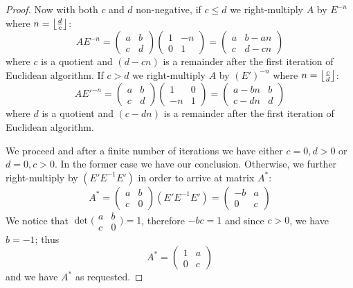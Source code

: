 \documentclass{article}
\theoremstyle{definition}
\DeclarePairedDelimiter\floor{\lfloor}{\rfloor}
\begin{document}
\begin{proof}
Now with both $c$ and $d$ non-negative, if $c \leq d$ we right-multiply $A$ by $E^{-n}$ where $n = \floor*{ \frac{d}{c} }$:
\[
    A E^{-n} =   
    \begin{pmatrix}
        a & b \\
        c & d
    \end{pmatrix}
    \begin{pmatrix}
        1 & -n \\
        0 & 1
    \end{pmatrix}
    =
    \begin{pmatrix}
        a & b-an \\
        c & d-cn
    \end{pmatrix}
\]
where $c$ is a quotient and $(d-cn)$ is a remainder after the first iteration of Euclidean algorithm.
If $c > d$ we right-multiply $A$ by $(E')^{-n}$ where $n = \floor*{ \frac{c}{d} }$:
\[
    A E'^{-n} =   
    \begin{pmatrix}
        a & b \\
        c & d
    \end{pmatrix}
    \begin{pmatrix}
        1 & 0 \\
        -n & 1
    \end{pmatrix}
    =
    \begin{pmatrix}
        a-bn & b \\
        c-dn & d
    \end{pmatrix}
\]
where $d$ is a quotient and $(c-dn)$ is a remainder after the first iteration of Euclidean algorithm.

We proceed and after a finite number of iterations we have either $c=0, d>0$ or $d=0, c>0$. In the former case we have our conclusion. Otherwise, we further right-multiply by $(E' E^{-1} E')$ in order to arrive at matrix $A^*$:
\[
    A^* =
    \begin{pmatrix}
        a & b \\
        c & 0
    \end{pmatrix}
    (E' E^{-1} E')
    =
    \begin{pmatrix}
        -b & a \\
        0 & c
    \end{pmatrix}
\]
We notice that
$
\det
\bigl(
\begin{smallmatrix}
    a & b \\
    c & 0
\end{smallmatrix}
\bigr)
=1 $, therefore $-bc=1$ and since $c > 0$, we have $b = -1$; thus
\[
    A^* =
    \begin{pmatrix}
        1 & a \\
        0 & c
    \end{pmatrix}
\]
and we have $A^*$ as requested.

\end{proof}
\end{document}
